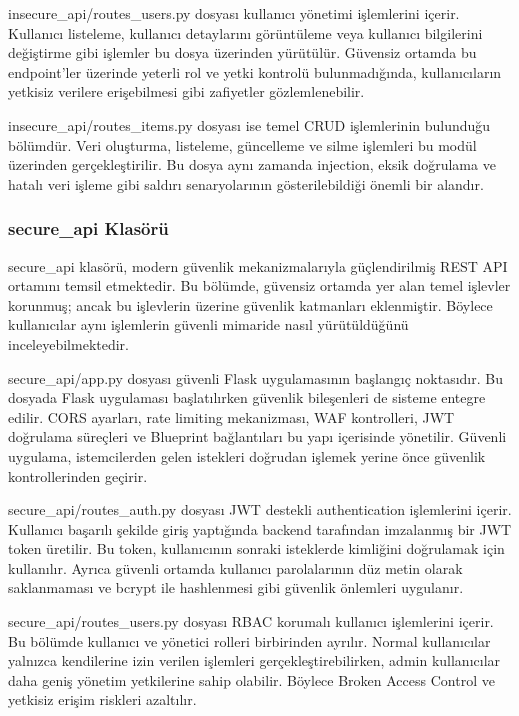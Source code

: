 insecure\_api/routes\_users.py dosyası kullanıcı yönetimi işlemlerini içerir. Kullanıcı listeleme, kullanıcı detaylarını görüntüleme veya kullanıcı bilgilerini değiştirme gibi işlemler bu dosya üzerinden yürütülür. Güvensiz ortamda bu endpoint’ler üzerinde yeterli rol ve yetki kontrolü bulunmadığında, kullanıcıların yetkisiz verilere erişebilmesi gibi zafiyetler gözlemlenebilir.

insecure\_api/routes\_items.py dosyası ise temel CRUD işlemlerinin bulunduğu bölümdür. Veri oluşturma, listeleme, güncelleme ve silme işlemleri bu modül üzerinden gerçekleştirilir. Bu dosya aynı zamanda injection, eksik doğrulama ve hatalı veri işleme gibi saldırı senaryolarının gösterilebildiği önemli bir alandır.

\subsubsection{secure\_api Klasörü}

secure\_api klasörü, modern güvenlik mekanizmalarıyla güçlendirilmiş REST API ortamını temsil etmektedir. Bu bölümde, güvensiz ortamda yer alan temel işlevler korunmuş; ancak bu işlevlerin üzerine güvenlik katmanları eklenmiştir. Böylece kullanıcılar aynı işlemlerin güvenli mimaride nasıl yürütüldüğünü inceleyebilmektedir.

secure\_api/app.py dosyası güvenli Flask uygulamasının başlangıç noktasıdır. Bu dosyada Flask uygulaması başlatılırken güvenlik bileşenleri de sisteme entegre edilir. CORS ayarları, rate limiting mekanizması, WAF kontrolleri, JWT doğrulama süreçleri ve Blueprint bağlantıları bu yapı içerisinde yönetilir. Güvenli uygulama, istemcilerden gelen istekleri doğrudan işlemek yerine önce güvenlik kontrollerinden geçirir.

secure\_api/routes\_auth.py dosyası JWT destekli authentication işlemlerini içerir. Kullanıcı başarılı şekilde giriş yaptığında backend tarafından imzalanmış bir JWT token üretilir. Bu token, kullanıcının sonraki isteklerde kimliğini doğrulamak için kullanılır. Ayrıca güvenli ortamda kullanıcı parolalarının düz metin olarak saklanmaması ve bcrypt ile hashlenmesi gibi güvenlik önlemleri uygulanır.

secure\_api/routes\_users.py dosyası RBAC korumalı kullanıcı işlemlerini içerir. Bu bölümde kullanıcı ve yönetici rolleri birbirinden ayrılır. Normal kullanıcılar yalnızca kendilerine izin verilen işlemleri gerçekleştirebilirken, admin kullanıcılar daha geniş yönetim yetkilerine sahip olabilir. Böylece Broken Access Control ve yetkisiz erişim riskleri azaltılır.

